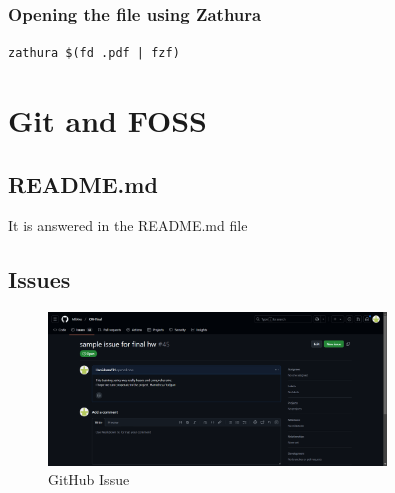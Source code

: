\documentclass{article}
\begin{document}
    \subsubsection{Opening the file using Zathura}
            \hspace*{1cm} \texttt{zathura \$(fd .pdf | fzf)}

    
\section{Git and FOSS}
    \subsection{README.md}
        It is answered in the README.md file


    \subsection{Issues}
        \begin{figure}[h]
            \centering
            \includegraphics[width=0.8\textwidth]{hi.png}
            \caption{GitHub Issue}
        \end{figure}


        
\end{document}
